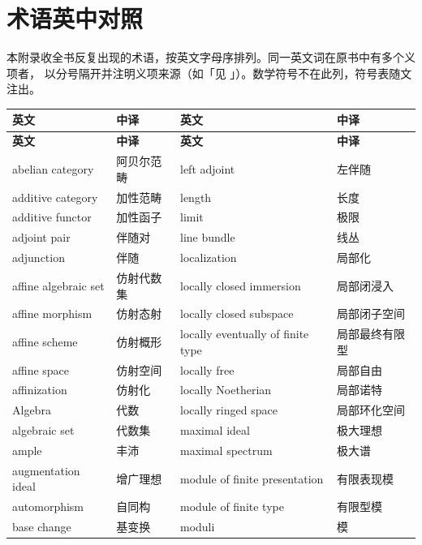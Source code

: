 \section{术语英中对照}\label{sec:B}

本附录收全书反复出现的术语，按英文字母序排列。同一英文词在原书中有多个义项者，
以分号隔开并注明义项来源（如「见 」）。数学符号不在此列，符号表随文注出。

\small
\setlength{\tabcolsep}{4pt}
\begin{longtable}{@{}>{\raggedright\arraybackslash}p{}>{\raggedright\arraybackslash}p{}>{\raggedright\arraybackslash}p{}>{\raggedright\arraybackslash}p{}@{}}
\toprule
\textbf{英文} & \textbf{中译} & \textbf{英文} & \textbf{中译} \\
\midrule
\endfirsthead
\toprule
\textbf{英文} & \textbf{中译} & \textbf{英文} & \textbf{中译} \\
\midrule
\endhead
\bottomrule
\endfoot
abelian category & 阿贝尔范畴 & left adjoint & 左伴随 \\
additive category & 加性范畴 & length & 长度 \\
additive functor & 加性函子 & limit & 极限 \\
adjoint pair & 伴随对 & line bundle & 线丛 \\
adjunction & 伴随 & localization & 局部化 \\
affine algebraic set & 仿射代数集 & locally closed immersion & 局部闭浸入 \\
affine morphism & 仿射态射 & locally closed subspace & 局部闭子空间 \\
affine scheme & 仿射概形 & locally eventually of finite type & 局部最终有限型 \\
affine space & 仿射空间 & locally free & 局部自由 \\
affinization & 仿射化 & locally Noetherian & 局部诺特 \\
Algebra & 代数 & locally ringed space & 局部环化空间 \\
algebraic set & 代数集 & maximal ideal & 极大理想 \\
ample & 丰沛 & maximal spectrum & 极大谱 \\
augmentation ideal & 增广理想 & module of finite presentation & 有限表现模 \\
automorphism & 自同构 & module of finite type & 有限型模 \\
base change & 基变换 & moduli & 模 \\

\end{longtable}
